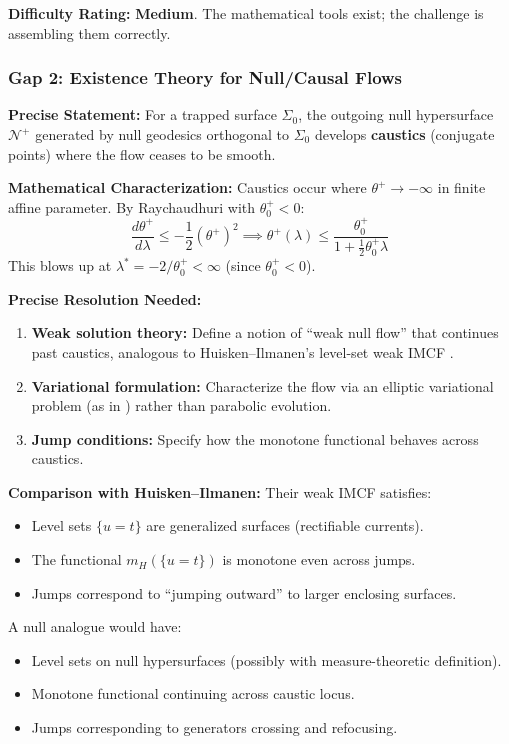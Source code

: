 \textbf{Difficulty Rating:} \textbf{Medium}. The mathematical tools exist; the challenge is assembling them correctly.

\subsubsection{Gap 2: Existence Theory for Null/Causal Flows}

\textbf{Precise Statement:} For a trapped surface $\Sigma_0$, the outgoing null hypersurface $\mathcal{N}^+$ generated by null geodesics orthogonal to $\Sigma_0$ develops \textbf{caustics} (conjugate points) where the flow ceases to be smooth.

\textbf{Mathematical Characterization:} Caustics occur where $\theta^+ \to -\infty$ in finite affine parameter. By Raychaudhuri with $\theta^+_0 < 0$:
\begin{equation}
    \frac{d\theta^+}{d\lambda} \leq -\frac{1}{2}(\theta^+)^2 \implies \theta^+(\lambda) \leq \frac{\theta^+_0}{1 + \frac{1}{2}\theta^+_0 \lambda}
\end{equation}
This blows up at $\lambda^* = -2/\theta^+_0 < \infty$ (since $\theta^+_0 < 0$).

\textbf{Precise Resolution Needed:}
\begin{enumerate}
    \item[(a)] \textbf{Weak solution theory:} Define a notion of ``weak null flow'' that continues past caustics, analogous to Huisken--Ilmanen's level-set weak IMCF \cite{huisken2001}.
    \item[(b)] \textbf{Variational formulation:} Characterize the flow via an elliptic variational problem (as in \cite{huisken2001}) rather than parabolic evolution.
    \item[(c)] \textbf{Jump conditions:} Specify how the monotone functional behaves across caustics.
\end{enumerate}

\textbf{Comparison with Huisken--Ilmanen:} Their weak IMCF satisfies:
\begin{itemize}
    \item Level sets $\{u = t\}$ are generalized surfaces (rectifiable currents).
    \item The functional $m_H(\{u = t\})$ is monotone even across jumps.
    \item Jumps correspond to ``jumping outward'' to larger enclosing surfaces.
\end{itemize}
A null analogue would have:
\begin{itemize}
    \item Level sets on null hypersurfaces (possibly with measure-theoretic definition).
    \item Monotone functional continuing across caustic locus.
    \item Jumps corresponding to generators crossing and refocusing.
\end{itemize}


